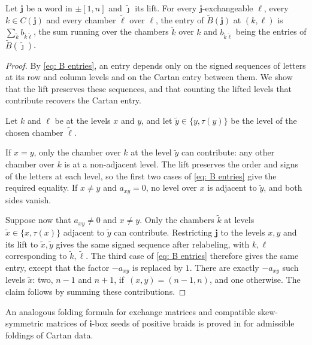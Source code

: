 \documentclass[a4paper]{amsart}
\numberwithin{equation}{section}
\theoremstyle{definition}
\theoremstyle{remark}
\newcommand{\bfj}{\mathbf{j}}
\newcommand{\tB}{\widetilde{B}}
\begin{document}
\begin{lemma}
  \label{lem: fold BFZ}
  Let $\bfj$ be a word in $\pm[1,n]$ and $\widetilde{\boldsymbol{\jmath}}$ its lift.
  For every $\bfj$-exchangeable $\ell$, every $k\in C(\bfj)$ and every chamber $\widetilde{\ell}$ over $\ell$, the entry of $\tB(\bfj)$ at $(k,\ell)$ is $\sum_{\widetilde{k}}b_{\widetilde{k}\widetilde{\ell}}$, the sum running over the chambers $\widetilde{k}$ over $k$ and $b_{\widetilde{k}\widetilde{\ell}}$ being the entries of $\tB(\widetilde{\boldsymbol{\jmath}})$.
\end{lemma}
\begin{proof}
  By \eqref{eq: B entries}, an entry depends only on the signed sequences of letters at its row and column levels and on the Cartan entry between them.
  We show that the lift preserves these sequences, and that counting the lifted levels that contribute recovers the Cartan entry.

  Let $k$ and $\ell$ be at the levels $x$ and $y$, and let $\widetilde{y}\in\{y,\tau(y)\}$ be the level of the chosen chamber $\widetilde{\ell}$.

  If $x=y$, only the chamber over $k$ at the level $\widetilde{y}$ can contribute: any other chamber over $k$ is at a non-adjacent level.
  The lift preserves the order and signs of the letters at each level, so the first two cases of \eqref{eq: B entries} give the required equality.
  If $x\neq y$ and $a_{xy}=0$, no level over $x$ is adjacent to $\widetilde{y}$, and both sides vanish.

  Suppose now that $a_{xy}\neq0$ and $x\neq y$.
  Only the chambers $\widetilde{k}$ at levels $\widetilde{x}\in\{x,\tau(x)\}$ adjacent to $\widetilde{y}$ can contribute.
  Restricting $\bfj$ to the levels $x,y$ and its lift to $\widetilde{x},\widetilde{y}$ gives the same signed sequence after relabeling, with $k,\ell$ corresponding to $\widetilde{k},\widetilde{\ell}$.
  The third case of \eqref{eq: B entries} therefore gives the same entry, except that the factor $-a_{xy}$ is replaced by $1$.
  There are exactly $-a_{xy}$ such levels $\widetilde{x}$: two, $n-1$ and $n+1$, if~$(x,y)=(n-1,n)$, and one otherwise.
  The claim follows by summing these contributions.
\end{proof}
An analogous folding formula for exchange matrices and compatible skew-symmetric matrices of $\mathbf{i}$-box seeds of positive braids is proved in \cite[Theorem~3.15]{JO26} for admissible foldings of Cartan data.
\end{document}
